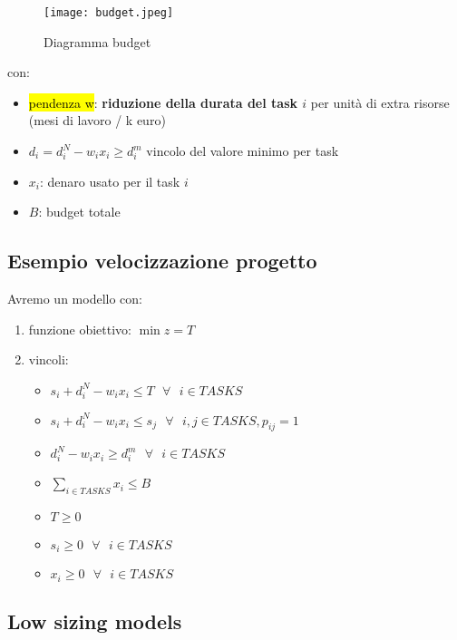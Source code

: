 \begin{figure}[H]
\centering
\texttt{[image: budget.jpeg]}
\caption{Diagramma budget} 
\label{budget}
\end{figure}


con:

\begin{itemize}
	\item \hl{pendenza w}: \textbf{riduzione della durata del task $i$} per unità di extra risorse (mesi di lavoro / k euro)
	\item $d_i = d_i^N - w_i x_i \geq d_i^m$ vincolo del valore minimo per task
	\item $x_i$: denaro usato per il task $i$
	\item $B$: budget totale

\end{itemize}


\subsection{Esempio velocizzazione progetto}

Avremo un modello con:

\begin{enumerate}
	\item funzione obiettivo: $\min z = T$
	\item vincoli:
		
		\begin{itemize}
			\item $s_i + d_i^N - w_i x_i \leq T\ \ \ \forall\ \ \ i \in TASKS$
			\item $s_i + d_i^N - w_i x_i \leq s_j\ \ \ \forall\ \ \ i, j \in TASKS, p_{ij} = 1$
			\item $d_i^N - w_i x_i \geq d_i^m\ \ \ \forall\ \ \ i \in TASKS$
			\item $\sum_{i \in TASKS} x_i \leq B$
			\item $T \geq 0$
			\item $s_i \geq 0\ \ \ \forall\ \ \ i \in TASKS$
			\item $x_i \geq 0\ \ \ \forall\ \ \ i \in TASKS$
		\end{itemize}
\end{enumerate}


\subsection{Low sizing models}

